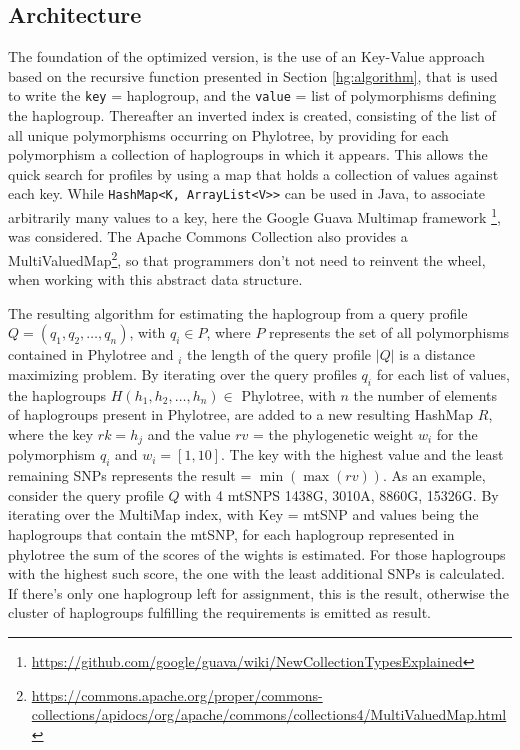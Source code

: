 \subsection{Architecture}
The foundation of the optimized version, is the use of an Key-Value approach based on the recursive function presented in Section \ref{hg:algorithm}, that is used to write the \texttt{key} = haplogroup, and the \texttt{value} = list of polymorphisms defining the haplogroup. Thereafter an inverted index is created, consisting of the list of all unique polymorphisms occurring on Phylotree, by providing for each polymorphism a collection of haplogroups in which it appears. This allows the quick search for profiles by using a map that holds a collection of values against each key. While \texttt{HashMap<K, ArrayList<V>>} can be used in Java, to associate arbitrarily many values to a key, here the Google Guava Multimap framework \footnote{\url{https://github.com/google/guava/wiki/NewCollectionTypesExplained}}, was considered. The Apache Commons Collection also provides a MultiValuedMap\footnote{\url{https://commons.apache.org/proper/commons-collections/apidocs/org/apache/commons/collections4/MultiValuedMap.html}}, so that programmers don't not need to reinvent the wheel, when working with this abstract data structure.

The resulting algorithm for estimating the haplogroup from a query profile $Q  = \left(q_1,q_2,\dotsc,q_n\right)$, with $q_i \in P$, where $P$ represents the set of all polymorphisms contained in Phylotree and $_i$ the length of the query profile $|Q|$ is a distance maximizing problem. By iterating over the query profiles $q_i$ for each list of values, the haplogroups $H \left(h_1,h_2,\dotsc,h_n\right) \in$ Phylotree, with $n$ the number of elements of haplogroups present in Phylotree, are added to a new resulting HashMap $R$, where the key $rk = h_j$ and the value $rv$ = the phylogenetic weight $w_i$ for the polymorphism $q_i$ and $w_i = \left[1, 10\right]$. The key with the highest value and the least remaining SNPs represents the result = $ \min\left(\max\left(rv\right)\right)$. 
As an example, consider the query profile $Q$ with 4 mtSNPS  1438G, 3010A, 8860G, 15326G. By iterating over the MultiMap index, with Key = mtSNP and values being the haplogroups that contain the mtSNP, for each haplogroup represented in phylotree the sum of the scores of the wights is estimated. For those haplogroups with the highest such score, the one with the least additional SNPs is calculated. If there's only one haplogroup left for assignment, this is the result, otherwise the cluster of haplogroups fulfilling the requirements is emitted as result.

